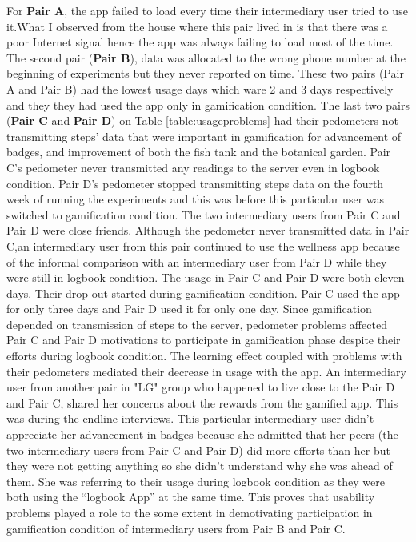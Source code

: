 For \textbf{Pair A}, the app failed to load every time their intermediary user tried to use it.What I observed from the house where this pair lived in is that there was a poor Internet signal hence the app was always failing to load most of the time. The second pair (\textbf{Pair B}), data was allocated to the wrong phone number at the beginning of experiments but they never reported on time. These two pairs (Pair A and Pair B) had the lowest usage days which ware 2 and 3 days respectively and they they had used the app only in gamification condition. The last two pairs (\textbf{Pair C} and \textbf{Pair D}) on Table \ref{table:usageproblems} had their pedometers not transmitting steps' data that were important in gamification for advancement of badges, and improvement of both the fish tank and the botanical garden. Pair C's pedometer never transmitted any readings to the server even in logbook condition.  Pair D's pedometer stopped transmitting steps data on the fourth week of running the experiments and this was before this particular user was switched to gamification condition. The two intermediary users from Pair C and Pair D were close friends. Although the pedometer never transmitted data in Pair C,an intermediary user from this pair continued to use the wellness app because of the informal comparison with an intermediary user from Pair D while they were still in logbook condition. The usage in Pair C and Pair D were both eleven days. Their drop out started during gamification condition. Pair C used the app for only three days and Pair D used it for only one day. Since gamification depended on transmission of steps to the server, pedometer problems affected Pair C and Pair D motivations to participate in gamification phase despite their efforts during logbook condition. The learning effect coupled with problems with their pedometers mediated their decrease in usage with the app.  An intermediary user from another pair in "LG" group who happened to live close to the Pair D and Pair C, shared her concerns about the rewards from the gamified app. This was during the endline interviews. This particular intermediary user didn't appreciate her advancement in badges because she admitted that her peers (the two intermediary users from Pair C and Pair D) did more efforts than her but they were not getting anything so she didn't understand why she was ahead of them. She was referring to their usage during logbook condition as they were both using the ``logbook App'' at the same time.  This proves that usability problems played a role to the some extent in demotivating participation in gamification condition  of intermediary users from Pair B and Pair C.\newline

